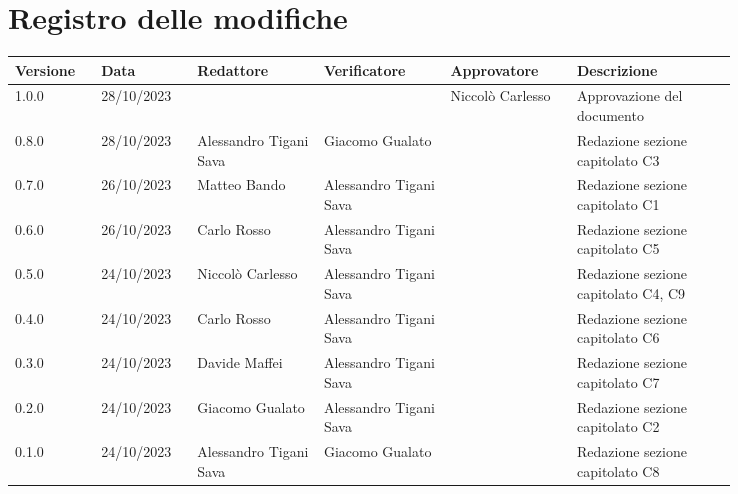 \section*{Registro delle modifiche}
{
\renewcommand{\arraystretch}{1.5}
\scriptsize
\begin{tabular}{p{0.10\linewidth}p{0.10\linewidth}p{0.15\linewidth}p{0.15\linewidth}p{0.15\linewidth}p{0.19\linewidth}}
    \textbf{Versione}   & \textbf{Data} & \textbf{Redattore}     & \textbf{Verificatore} & \textbf{Approvatore}  & \textbf{Descrizione}  \\
    \hline
    1.0.0   & 28/10/2023    &                        &                          & Niccolò Carlesso   & Approvazione del documento   \\
    \hline
    0.8.0   & 28/10/2023    & Alessandro Tigani Sava & Giacomo Gualato          &   & Redazione sezione capitolato C3   \\
    \hline
    0.7.0   & 26/10/2023    & Matteo Bando           & Alessandro Tigani Sava   &   & Redazione sezione capitolato C1   \\
    \hline
    0.6.0   & 26/10/2023    & Carlo Rosso            & Alessandro Tigani Sava   &   & Redazione sezione capitolato C5   \\   
    \hline 
    0.5.0   & 24/10/2023    & Niccolò Carlesso       & Alessandro Tigani Sava   &   & Redazione sezione capitolato C4, C9  	\\
    \hline
    0.4.0   & 24/10/2023    & Carlo Rosso            & Alessandro Tigani Sava   &   & Redazione sezione capitolato C6  	\\
    \hline
    0.3.0   & 24/10/2023    & Davide Maffei          & Alessandro Tigani Sava   &   & Redazione sezione capitolato C7   \\
    \hline
    0.2.0   & 24/10/2023    & Giacomo Gualato        & Alessandro Tigani Sava   &   & Redazione sezione capitolato C2   \\
    \hline
    0.1.0   & 24/10/2023    & Alessandro Tigani Sava & Giacomo Gualato          &   & Redazione sezione capitolato C8   \\    
    \hline
\end{tabular}
}